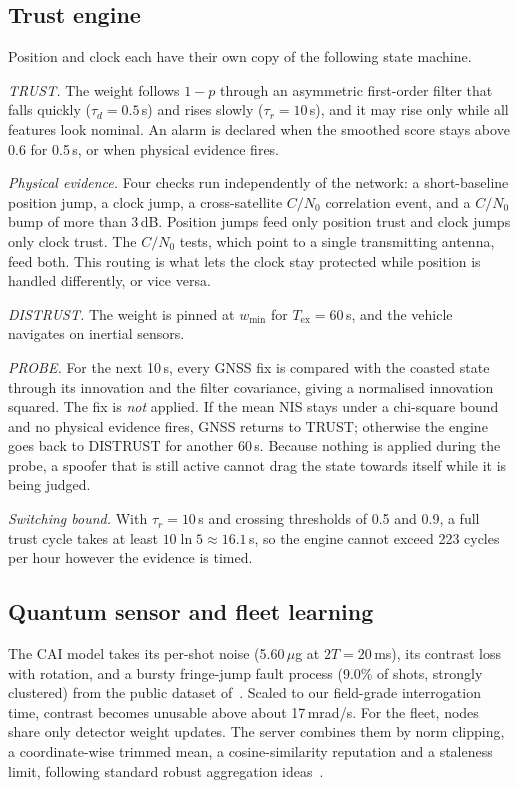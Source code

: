 \documentclass[conference]{IEEEtran}
\begin{document}
\subsection{Trust engine}
Position and clock each have their own copy of the following state machine.

\textit{TRUST.} The weight follows $1-p$ through an asymmetric first-order filter that falls quickly ($\tau_d=0.5$\,s) and rises slowly ($\tau_r=10$\,s), and it may rise only while all features look nominal. An alarm is declared when the smoothed score stays above 0.6 for 0.5\,s, or when physical evidence fires.

\textit{Physical evidence.} Four checks run independently of the network: a short-baseline position jump, a clock jump, a cross-satellite $C/N_0$ correlation event, and a $C/N_0$ bump of more than 3\,dB. Position jumps feed only position trust and clock jumps only clock trust. The $C/N_0$ tests, which point to a single transmitting antenna, feed both. This routing is what lets the clock stay protected while position is handled differently, or vice versa.

\textit{DISTRUST.} The weight is pinned at $w_{\min}$ for $T_{\text{ex}}=60$\,s, and the vehicle navigates on inertial sensors.

\textit{PROBE.} For the next 10\,s, every GNSS fix is compared with the coasted state through its innovation and the filter covariance, giving a normalised innovation squared. The fix is \emph{not} applied. If the mean NIS stays under a chi-square bound and no physical evidence fires, GNSS returns to TRUST; otherwise the engine goes back to DISTRUST for another 60\,s. Because nothing is applied during the probe, a spoofer that is still active cannot drag the state towards itself while it is being judged.

\textit{Switching bound.} With $\tau_r=10$\,s and crossing thresholds of 0.5 and 0.9, a full trust cycle takes at least $10\ln 5\approx16.1$\,s, so the engine cannot exceed 223 cycles per hour however the evidence is timed.

\subsection{Quantum sensor and fleet learning}
The CAI model takes its per-shot noise (5.60\,$\mu$g at $2T=20$\,ms), its contrast loss with rotation, and a bursty fringe-jump fault process (9.0\% of shots, strongly clustered) from the public dataset of~\cite{darmagnac2024atom,darmagnac2024dataset}. Scaled to our field-grade interrogation time, contrast becomes unusable above about 17\,mrad/s. For the fleet, nodes share only detector weight updates. The server combines them by norm clipping, a coordinate-wise trimmed mean, a cosine-similarity reputation and a staleness limit, following standard robust aggregation ideas~\cite{yin2018byzantine,baruch2019alie}.
\end{document}
